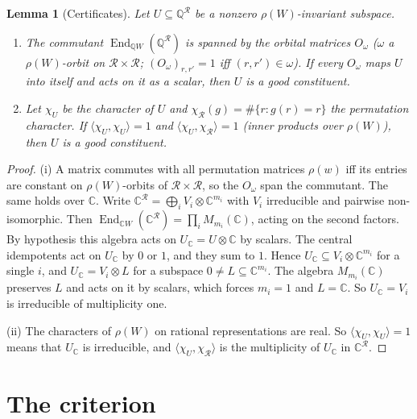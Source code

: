 \documentclass[11pt]{amsart}
\newtheorem{lemma}[theorem]{Lemma}
\theoremstyle{definition}
\newcommand{\Q}{\mathbb{Q}}
\newcommand{\C}{\mathbb{C}}
\newcommand{\R}{\mathcal{R}}
\newcommand{\End}{\operatorname{End}}
\begin{document}
\begin{lemma}[Certificates]\label{lem:cert}
Let $U\subseteq\Q^\R$ be a nonzero $\rho(W)$-invariant subspace.
\begin{enumerate}[label=(\roman*)]
\item The commutant $\End_{\Q W}(\Q^\R)$ is spanned by the orbital matrices $O_\omega$ ($\omega$ a
$\rho(W)$-orbit on $\R\times\R$; $(O_\omega)_{r,r'}=1$ iff $(r,r')\in\omega$). If every $O_\omega$ maps $U$ into
itself and acts on it as a scalar, then $U$ is a good constituent.
\item Let $\chi_U$ be the character of $U$ and $\chi_\R(g)=\#\{r:g(r)=r\}$ the permutation character. If
$\langle\chi_U,\chi_U\rangle=1$ and $\langle\chi_U,\chi_\R\rangle=1$ (inner products over $\rho(W)$), then $U$ is a
good constituent.
\end{enumerate}
\end{lemma}

\begin{proof}
(i) A matrix commutes with all permutation matrices $\rho(w)$ iff its entries are constant on $\rho(W)$-orbits of
$\R\times\R$, so the $O_\omega$ span the commutant. The same holds over $\C$. Write
$\C^\R=\bigoplus_iV_i\otimes\C^{m_i}$ with $V_i$ irreducible and pairwise non-isomorphic. Then
$\End_{\C W}(\C^\R)=\prod_iM_{m_i}(\C)$, acting on the second factors. By hypothesis this algebra acts on
$U_\C=U\otimes\C$ by scalars. The central idempotents act on $U_\C$ by $0$ or $1$, and they sum to $1$. Hence
$U_\C\subseteq V_i\otimes\C^{m_i}$ for a single $i$, and $U_\C=V_i\otimes L$ for a subspace $0\ne L\subseteq\C^{m_i}$.
The algebra $M_{m_i}(\C)$ preserves $L$ and acts on it by scalars, which forces $m_i=1$ and $L=\C$. So $U_\C=V_i$ is
irreducible of multiplicity one.

(ii) The characters of $\rho(W)$ on rational representations are real. So $\langle\chi_U,\chi_U\rangle=1$ means
that $U_\C$ is irreducible, and $\langle\chi_U,\chi_\R\rangle$ is the multiplicity of $U_\C$ in $\C^\R$.
\end{proof}

\section{The criterion}
\end{document}
